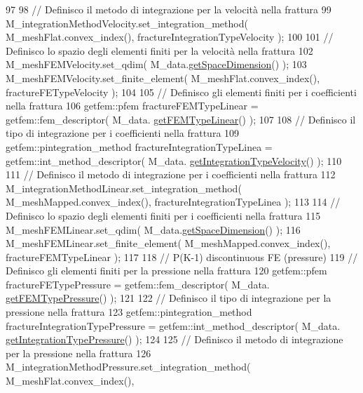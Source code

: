 \begin{DoxyCode}
97 
98     \textcolor{comment}{// Definisco il metodo di integrazione per la velocità nella frattura}
99     M\_integrationMethodVelocity.set\_integration\_method( M\_meshFlat.convex\_index(), 
      fractureIntegrationTypeVelocity );
100     
101     \textcolor{comment}{// Definisco lo spazio degli elementi finiti per la velocità nella frattura}
102     M\_meshFEMVelocity.set\_qdim( M\_data.\hyperlink{classFractureData_a4ead03266295fe14fa3285692f945d89}{getSpaceDimension}() );
103     M\_meshFEMVelocity.set\_finite\_element( M\_meshFlat.convex\_index(), fractureFETypeVelocity );
104 
105     \textcolor{comment}{// Definisco gli elementi finiti per i coefficienti nella frattura}
106     getfem::pfem fractureFEMTypeLinear = getfem::fem\_descriptor( M\_data.
      \hyperlink{classFractureData_a606c22e054fdb5f8602ce39fa6ae15cc}{getFEMTypeLinear}() );
107 
108     \textcolor{comment}{// Definisco il tipo di integrazione per i coefficienti nella frattura}
109     getfem::pintegration\_method fractureIntegrationTypeLinea = getfem::int\_method\_descriptor( M\_data.
      \hyperlink{classFractureData_a8a8a198482de6bf4104746bc1d0510c6}{getIntegrationTypeVelocity}() );
110 
111     \textcolor{comment}{// Definisco il metodo di integrazione per i coefficienti nella frattura}
112     M\_integrationMethodLinear.set\_integration\_method( M\_meshMapped.convex\_index(), 
      fractureIntegrationTypeLinea );
113 
114     \textcolor{comment}{// Definisco lo spazio degli elementi finiti per i coefficienti nella frattura}
115     M\_meshFEMLinear.set\_qdim( M\_data.\hyperlink{classFractureData_a4ead03266295fe14fa3285692f945d89}{getSpaceDimension}() );
116     M\_meshFEMLinear.set\_finite\_element( M\_meshMapped.convex\_index(), fractureFEMTypeLinear );
117 
118     \textcolor{comment}{// P(K-1) discontinuous FE (pressure)}
119     \textcolor{comment}{// Definisco gli elementi finiti per la pressione nella frattura}
120     getfem::pfem fractureFETypePressure = getfem::fem\_descriptor( M\_data.
      \hyperlink{classFractureData_a643b9a8a33405ec7aaa6b5612cb81d57}{getFEMTypePressure}() );
121 
122     \textcolor{comment}{// Definisco il tipo di integrazione per la pressione nella frattura}
123     getfem::pintegration\_method fractureIntegrationTypePressure = getfem::int\_method\_descriptor( M\_data.
      \hyperlink{classFractureData_a9333d8e89dc92023d97a48c1905ada76}{getIntegrationTypePressure}() );
124 
125     \textcolor{comment}{// Definisco il metodo di integrazione per la pressione nella frattura}
126     M\_integrationMethodPressure.set\_integration\_method( M\_meshFlat.convex\_index(), 

\end{DoxyCode}
